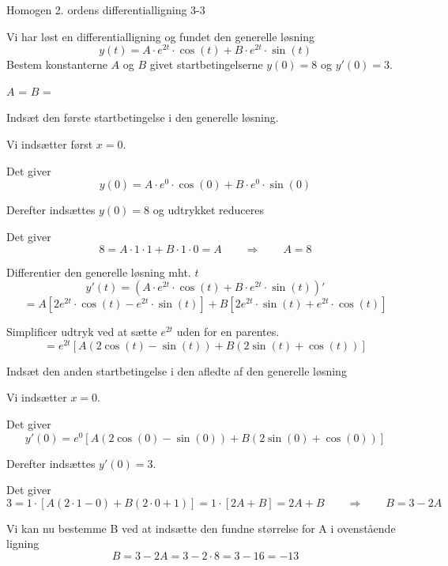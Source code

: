 \documentclass{article}
\begin{document}
\newpage

\begin{exercise}{Homogen 2. ordens differentialligning 3-3}
	
	Vi har løst en differentialligning og fundet den generelle løsning
	\[
	y(t) = A \cdot e^{2 t}  \cdot \cos(t)+ B \cdot e^{2 t}  \cdot \sin(t)
	\]
	Bestem konstanterne $A$ og $B$ givet startbetingelserne $y(0)=8$ og $y'(0)=3$.
	
	
	$A$ = 		
$B$ = 
	
	\hint
	
	Indsæt den første startbetingelse i den generelle løsning. 
	
	
	\hint
	
	Vi indsætter først $x=0$.
	
	\hint
	
	Det giver
	\[
	y(0)=  A \cdot e^{0}  \cdot \cos(0)+ B \cdot e^{0}  \cdot \sin(0)
	\]
	
	\hint
	
	Derefter indsættes $y(0)=8$ og udtrykket reduceres
	
	\hint 
	
	Det giver 
	\[
	8= A \cdot 1  \cdot 1+ B \cdot 1  \cdot 0  = A \qquad \Rightarrow \qquad A = 8
	\]
	
	\hint 
	
	Differentier den generelle løsning mht. $t$
	\[
	y'(t) = \left(A \cdot e^{2 t}  \cdot \cos(t)+ B \cdot e^{2 t}  \cdot \sin(t)\right)' 
	\]
	\[
	= A \left[2 e^{2t} \cdot \cos(t) - e^{2t} \cdot \sin(t) \right] + B \left[ 2 e^{2t} \cdot \sin(t) + e^{2t} \cdot \cos(t) \right] 
	\]
	
	\hint
	
	Simplificer udtryk ved at sætte $e^{2t}$ uden for en parentes.
	\[
	= e^{2t} \left[ A (2 \cos(t)-\sin(t)) + B (2 \sin(t) + \cos(t))   \right]
	\]
	
	\hint 
	
	Indsæt den anden startbetingelse i den afledte af den generelle løsning
	
	\hint
	
	Vi indsætter $x=0$.
	
	\hint 
	
	Det giver
	\[
	y'(0) = e^{0} \left[ A (2 \cos(0)- \sin(0)) + B (2 \sin(0) + \cos(0))   \right]
	\]
	
	\hint 
	
	Derefter indsættes $y'(0)=3$.	
	\hint
	
	Det giver
	\[
	3 = 1 \cdot \left[ A (2 \cdot 1 - 0) + B (2 \cdot 0 + 1)   \right] = 1 \cdot \left[ 2A + B    \right] = 2 A + B \qquad \Rightarrow \qquad B = 3 - 2 A
	\]
	
	\hint 
	
	Vi kan nu bestemme B ved at indsætte den fundne størrelse for A i ovenstående ligning
	\[
	B = 3 - 2 A = 3 - 2 \cdot 8  = 3 - 16  =  -13
	\]
	
	
\end{exercise}
\end{document}
